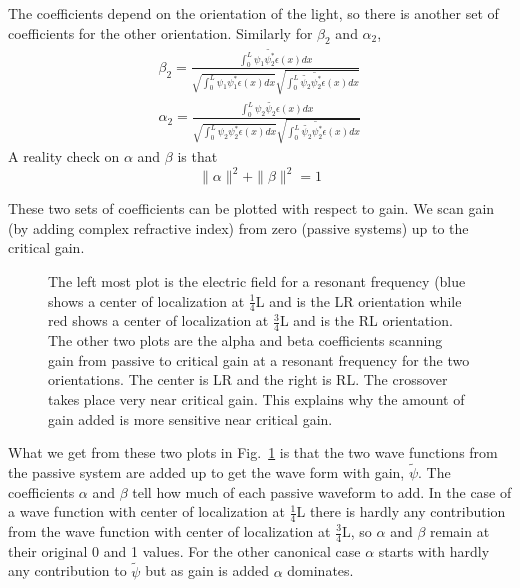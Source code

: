 The coefficients depend on the orientation of the light, so there is another set of coefficients for the other orientation. Similarly for $ \beta _2 $ and $ \alpha _2 $,
\begin{equation}  %
\begin{gathered}
\beta _2 = \frac{\int _0 ^L \psi _1 \tilde{\psi _2 ^*} \epsilon(x) dx}
{\sqrt{\int _0 ^L \psi _1 \psi _1 ^* \epsilon(x) dx}
 \sqrt{\int _0 ^L \tilde{\psi _2} \tilde{\psi _2 ^*} \epsilon(x) dx}} \\
\alpha _2 = \frac{\int _0 ^L \psi _2 \tilde{\psi _2} \epsilon(x) dx}
{\sqrt{\int _0 ^L \psi _2 \psi _2 ^* \epsilon(x) dx}
 \sqrt{\int _0 ^L \tilde{\psi _2} \tilde{\psi _2 ^*} \epsilon(x) dx}}
\end{gathered}
\end{equation}
A reality check on $\alpha$ and $\beta$ is that
\begin{equation}
\| \alpha \| ^2 + \| \beta \| ^2= 1
\end{equation}

These two sets of coefficients can be plotted with respect to gain. We scan gain (by adding complex refractive index) from zero (passive systems) up to the critical gain. 
\begin{figure}
\vskip -0.5cm
\centerline{
}
\vskip -0.5cm
\caption{The left most plot is the electric field for a resonant frequency (blue shows a center of localization at $ \frac{1}{4} $L and is the LR orientation while red shows a center of localization at $ \frac{3}{4} $L and is the RL orientation. The other two plots are the alpha and beta coefficients scanning gain from  passive to critical gain at a resonant frequency for the two orientations. The center is LR and the right is RL. The crossover takes place very near critical gain. This explains why the amount of gain added is more sensitive near critical gain.}
\label{fig:alphabeta}
\end{figure}

What we get from these two plots in Fig.~\ref{fig:alphabeta} is that the two wave functions from the passive system are added up to get the wave form with gain, $ \tilde{\psi}$. The coefficients $\alpha$ and $\beta$ tell how much of each passive waveform to add. In the case of a wave function with center of localization at $ \frac{1}{4} $L there is hardly any contribution from the wave function with center of localization at $ \frac{3}{4} $L, so $\alpha$ and $\beta$ remain at their original 0 and 1 values. For the other canonical case $\alpha$ starts with hardly any contribution to $ \tilde{\psi}$ but as gain is added $\alpha$ dominates.

